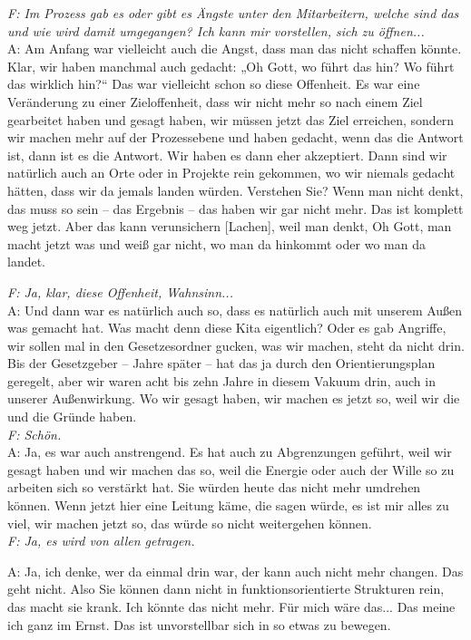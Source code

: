\begin{linenumbers*}
\emph{F: Im Prozess gab es oder gibt es Ängste unter den Mitarbeitern, welche sind das und wie wird damit umgegangen? Ich kann mir vorstellen, sich zu öffnen...}\\
A: Am Anfang war vielleicht auch die Angst, dass man das nicht schaffen könnte. Klar, wir haben manchmal auch gedacht: „Oh Gott, wo führt das hin? Wo führt das wirklich hin?“ Das war vielleicht schon so diese Offenheit. Es war eine Veränderung zu einer Zieloffenheit, dass wir nicht mehr so nach einem Ziel gearbeitet haben und gesagt haben, wir müssen jetzt das Ziel erreichen, sondern wir machen mehr auf der Prozessebene und haben gedacht, wenn das die Antwort ist, dann ist es die Antwort. Wir haben es dann eher akzeptiert. Dann sind wir natürlich auch an Orte oder in Projekte rein gekommen, wo wir niemals gedacht hätten, dass wir da jemals landen würden. Verstehen Sie? Wenn man nicht denkt, das muss so sein -- das Ergebnis -- das haben wir gar nicht mehr. Das ist komplett weg jetzt. Aber das kann verunsichern [Lachen], weil man denkt, Oh Gott, man macht jetzt was und weiß gar nicht, wo man da hinkommt oder wo man da landet. 

\emph{F: Ja, klar, diese Offenheit, Wahnsinn...}\\
A: Und dann war es natürlich auch so, dass es natürlich auch mit unserem Außen was gemacht hat. Was macht denn diese Kita eigentlich? Oder es gab Angriffe, wir sollen mal in den Gesetzesordner gucken, was wir machen, steht da nicht drin. Bis der Gesetzgeber -- Jahre später -- hat das ja durch den Orientierungsplan geregelt, aber wir waren acht bis zehn Jahre in diesem Vakuum drin, auch in unserer Außenwirkung. Wo wir gesagt haben, wir machen es jetzt so, weil wir die und die Gründe haben.\\
\emph{F: Schön.}\\
A: Ja, es war auch anstrengend. Es hat auch zu Abgrenzungen geführt, weil wir gesagt haben und wir machen das so, weil die Energie oder auch der Wille so zu arbeiten sich so verstärkt hat. Sie würden heute das nicht mehr umdrehen können. Wenn jetzt hier eine Leitung käme, die sagen würde, es ist mir alles zu viel, wir machen jetzt so, das würde so nicht weitergehen können.\\
\emph{F: Ja, es wird von allen getragen.}

A: Ja, ich denke, wer da einmal drin war, der kann auch nicht mehr changen. Das geht nicht. Also Sie können dann nicht in funktionsorientierte Strukturen rein, das macht sie krank. Ich könnte das nicht mehr. Für mich wäre das... Das meine ich ganz im Ernst. Das ist unvorstellbar sich in so etwas zu bewegen. 


\end{linenumbers*}
